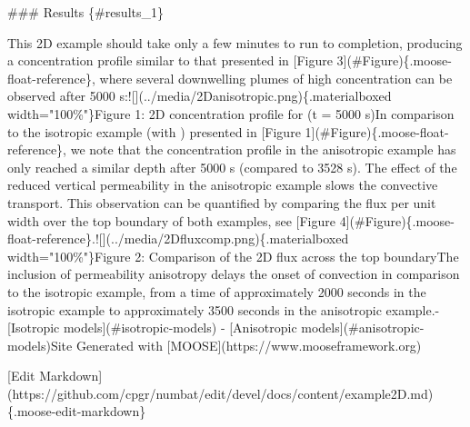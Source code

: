 \documentclass[12pt]{article}
\begin{document}
### Results \{#results\_1\}

This 2D example should take only a few minutes to run to completion,
producing a concentration profile similar to that presented in [Figure
3](#Figure)\{.moose-float-reference\}, where several downwelling plumes of
high concentration can be observed after 5000 s:![](../media/2Danisotropic.png)\{.materialboxed width="100\%"\}Figure 1: 2D concentration profile for (t = 5000 s)In comparison to the isotropic example (with
) presented in [Figure 1](#Figure)\{.moose-float-reference\}, we note that
the concentration profile in the anisotropic example has only reached a
similar depth after 5000 s (compared to 3528 s). The effect of the
reduced vertical permeability in the anisotropic example slows the
convective transport.
This observation can be quantified by comparing the flux per unit width
over the top boundary of both examples, see [Figure
4](#Figure)\{.moose-float-reference\}.![](../media/2Dfluxcomp.png)\{.materialboxed width="100\%"\}Figure 2: Comparison of the 2D flux across the
top boundaryThe inclusion of permeability anisotropy delays the onset of convection
in comparison to the isotropic example, from a time of approximately
2000 seconds in the isotropic example to approximately 3500 seconds in
the anisotropic example.-   [Isotropic models](#isotropic-models)
-   [Anisotropic models](#anisotropic-models)Site Generated with [MOOSE](https://www.mooseframework.org)

[Edit
Markdown](https://github.com/cpgr/numbat/edit/devel/docs/content/example2D.md)\{.moose-edit-markdown\}
\end{document}

